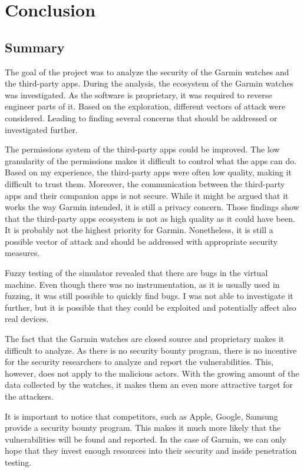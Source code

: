 \chapter{Conclusion}
\section{Summary}

The goal of the project was to analyze the security of the Garmin watches and the third-party apps.
During the analysis, the ecosystem of the Garmin watches was investigated.
As the software is proprietary, it was required to reverse engineer parts of it.
Based on the exploration, different vectors of attack were considered.
Leading to finding several concerns that should be addressed or investigated further.

The permissions system of the third-party apps could be improved.
The low granularity of the permissions makes it difficult to control what the apps can do.
Based on my experience, the third-party apps were often low quality, making it difficult to trust them.
Moreover, the communication between the third-party apps and their companion apps is not secure.
While it might be argued that it works the way Garmin intended, it is still a privacy concern.
Those findings show that the third-party apps ecosystem is not as high quality as it could have been.
It is probably not the highest priority for Garmin.
Nonetheless, it is still a possible vector of attack and should be addressed with appropriate security measures.

Fuzzy testing of the simulator revealed that there are bugs in the virtual machine.
Even though there was no instrumentation, as it is usually used in fuzzing, it was still possible to quickly find bugs.
I was not able to investigate it further, but it is possible that they could be exploited and potentially affect also real devices.

The fact that the Garmin watches are closed source and proprietary makes it difficult to analyze.
As there is no security bounty program, there is no incentive for the security researchers to analyze and report the vulnerabilities.
This, however, does not apply to the malicious actors.
With the growing amount of the data collected by the watches, it makes them an even more attractive target for the attackers.

It is important to notice that competitors, such as Apple, Google, Samsung provide a security bounty program.
This makes it much more likely that the vulnerabilities will be found and reported.
In the case of Garmin, we can only hope that they invest enough resources into their security and inside penetration testing.

